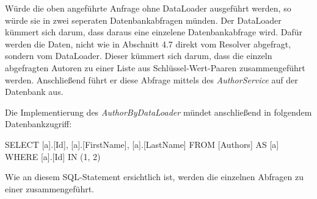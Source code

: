 Würde die oben angeführte Anfrage ohne DataLoader ausgeführt werden, so würde sie in zwei seperaten Datenbankabfragen münden.
Der DataLoader kümmert sich darum, dass daraus eine einzelene Datenbankabfrage wird.
Dafür werden die Daten, nicht wie in Abschnitt 4.7 direkt vom Resolver abgefragt, sondern vom DataLoader.
Dieser kümmert sich darum, dass die einzeln abgefragten Autoren zu einer Liste aus Schlüssel-Wert-Paaren zusammengeführt werden.
Anschließend führt er diese Abfrage mittels des \textit{AuthorService} auf der Datenbank aus.
\newline

Die Implementierung des \textit{AuthorByDataLoader} mündet anschließend in folgendem Datenbankzugriff:
\begin{JsCode}
SELECT [a].[Id], [a].[FirstName], [a].[LastName]
FROM [Authors] AS [a]
WHERE [a].[Id] IN (1, 2)
\end{JsCode}

Wie an diesem SQL-Statement ersichtlich ist, werden die einzelnen Abfragen zu einer zusammengeführt.
